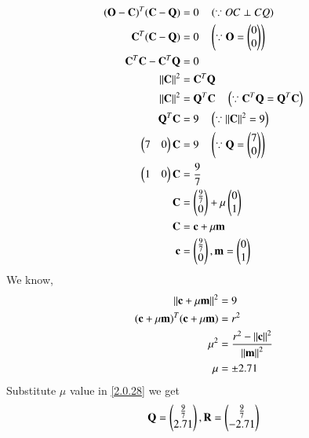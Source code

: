 \documentclass[journal,12pt,twocolumn]{IEEEtran}
\begin{document}
\begin{align}
(\mathbf{O}-\mathbf{C})^T (\mathbf{C}-\mathbf{Q}) &= 0 \quad \left(\because OC \perp CQ \right)
\\
\mathbf{C}^T(\mathbf{C}-\mathbf{Q}) &= 0 \quad \left(\because \mathbf{O}=\begin{pmatrix}0\\0\end{pmatrix}\right)
\\
\mathbf{C}^T \mathbf{C} - \mathbf{C}^T \mathbf{Q} &= 0  
\\
\left\lVert\mathbf{C}\right\rVert^2 &= \mathbf{C}^T \mathbf{Q}
\\
\left\lVert\mathbf{C}\right\rVert^2 &= \mathbf{Q}^T \mathbf{C}  \quad \left(\because \mathbf{C}^T \mathbf{Q} = \mathbf{Q}^T \mathbf{C}\right)
\\
\mathbf{Q}^T \mathbf{C} &= 9 \quad \left(\because \left\lVert\mathbf{C}\right\rVert^2 = 9\right)
\\
\begin{pmatrix}7&0\end{pmatrix} \mathbf{C} &= 9 \quad \left(\because \mathbf{Q} = \begin{pmatrix}7\\0\end{pmatrix} \right)
\\
\begin{pmatrix}1&0\end{pmatrix} \mathbf{C} &= \frac{9}{7}
\\
\mathbf{C} &= \begin{pmatrix}\frac{9}{7}\\0\end{pmatrix} + \mu \begin{pmatrix}0\\1\end{pmatrix} \label{2.0.28} 
\\
\mathbf{C}&=\mathbf{c}+\mu\mathbf{m} 
\\
\mathbf{c}&=\begin{pmatrix}\frac{9}{7}\\ 0\end{pmatrix},\mathbf{m}=\begin{pmatrix}0\\1\end{pmatrix}
\end{align}
We know,
\begin{align}
\left\lVert\mathbf{c}+\mu\mathbf{m}\right\rVert^2&=9
\\
(\mathbf{c}+\mu \mathbf{m})^T(\mathbf{c}+\mu \mathbf{m})&=r^2
\\
\mu^2&=\frac{r^2-\left\lVert\mathbf{c}\right\rVert^2}{\left\lVert\mathbf{m}\right\rVert^2}
\\
\mu &= \pm2.71
\end{align}
Substitute $\mu$  value in \eqref{2.0.28} we get
\begin{align}
\mathbf{Q}=\begin{pmatrix}\frac{9}{7}\\2.71\end{pmatrix},
\mathbf{R}=\begin{pmatrix}\frac{9}{7}\\-2.71\end{pmatrix}
\end{align}
\end{document}
